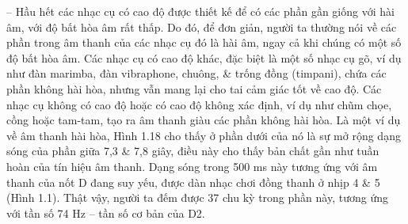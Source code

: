 \documentclass{article}
\begin{document}
\begin{itemize}
\begin{itemize}
\begin{itemize}
			-- Hầu hết các nhạc cụ có cao độ được thiết kế để có các phần gần giống với hài âm, với độ bất hòa âm rất thấp. Do đó, để đơn giản, người ta thường nói về các phần trong âm thanh của các nhạc cụ đó là hài âm, ngay cả khi chúng có một số độ bất hòa âm. Các nhạc cụ có cao độ khác, đặc biệt là một số nhạc cụ gõ, ví dụ như đàn marimba, đàn vibraphone, chuông, \& trống đồng (timpani), chứa các phần không hài hòa, nhưng vẫn mang lại cho tai cảm giác tốt về cao độ. Các nhạc cụ không có cao độ hoặc có cao độ không xác định, ví dụ như chũm chọe, cồng hoặc tam-tam, tạo ra âm thanh giàu các phần không hài hòa. Là một ví dụ về âm thanh hài hòa, {\sf Hình 1.18} cho thấy ở phần dưới của nó là sự mở rộng dạng sóng của phần giữa 7,3 \& 7,8 giây, điều này cho thấy bản chất gần như tuần hoàn của tín hiệu âm thanh. Dạng sóng trong 500 ms này tương ứng với âm thanh của nốt D đang suy yếu, được dàn nhạc chơi đồng thanh ở nhịp 4 \& 5 ({\sf Hình 1.1}). Thật vậy, người ta đếm được 37 chu kỳ trong phần này, tương ứng với tần số 74 Hz -- tần số cơ bản của D2.
			

\end{itemize}
\end{itemize}
\end{itemize}
\end{document}
